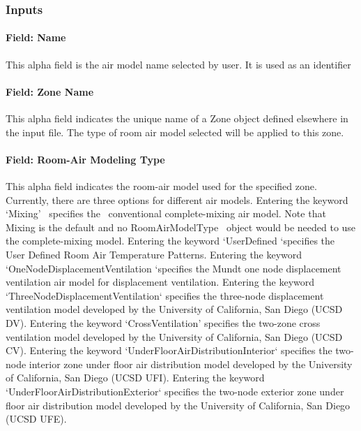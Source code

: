 \subsubsection{Inputs}\label{inputs-041}

\paragraph{Field: Name}\label{field-name-040}

This alpha field is the air model name selected by user. It is used as an identifier

\paragraph{Field: Zone Name}\label{field-zone-name-011}

This alpha field indicates the unique name of a Zone object defined elsewhere in the input file. The type of room air model selected will be applied to this zone.

\paragraph{Field: Room-Air Modeling Type}\label{field-room-air-modeling-type}

This alpha field indicates the room-air model used for the specified zone. Currently, there are three options for different air models. Entering the keyword `Mixing' ~specifies the~ conventional complete-mixing air model. Note that Mixing is the default and no RoomAirModelType ~object would be needed to use the complete-mixing model. Entering the keyword `UserDefined `specifies the User Defined Room Air Temperature Patterns. Entering the keyword `OneNodeDisplacementVentilation `specifies the Mundt one node displacement ventilation air model for displacement ventilation. Entering the keyword `ThreeNodeDisplacementVentilation` specifies the three-node displacement ventilation model developed by the University of California, San Diego (UCSD DV). Entering the keyword `CrossVentilation' specifies the two-zone cross ventilation model developed by the University of California, San Diego (UCSD CV). Entering the keyword `UnderFloorAirDistributionInterior` specifies the two-node interior zone under floor air distribution model developed by the University of California, San Diego (UCSD UFI). Entering the keyword `UnderFloorAirDistributionExterior` specifies the two-node exterior zone under floor air distribution model developed by the University of California, San Diego (UCSD UFE).

